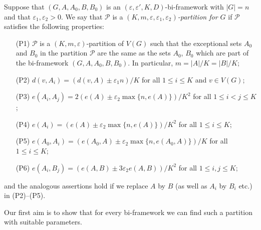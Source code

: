\documentclass{memo-l}
\def\COMMENT#1{}
\def\cP{\mathcal{P}}
\def\eps{\varepsilon}
\numberwithin{section}{chapter}
\numberwithin{equation}{section}
\numberwithin{firstthm}{section}
\numberwithin{figure}{section}
\begin{document}
{Suppose that $(G,A,A_0,B,B_0)$ is an $(\eps,\eps',K,D)$-bi-framework with $|G|=n$ and that
$\eps _1, \eps _2 >0$.
We say that $\cP$ is a \emph{$(K,m,\eps,\eps_1,\eps_2)$-partition for $G$} if 
$\cP$ satisfies the following properties:
\begin{itemize}
\item[(P1)] $\cP$ is a $(K,m,\eps)$-partition of $V(G)$
such that the exceptional sets $A_0$ and $B_0$ in the partition $\cP$ are the same as the
sets $A_0$, $B_0$ which are part of the bi-framework $(G,A,A_0,B,B_0)$. In particular, $m=|A|/K=|B|/K$;
\item[(P2)] $d(v, A_i)=(d(v, A)\pm \eps_1 n)/K$  for all $1 \le i\le K$ and $v\in V(G)$;
\item[(P3)] $e(A_i, A_j)=2(e(A) \pm  \eps_2 \max\{n, e(A)\} )/K^2$ for all $1\le i < j\le K$;
\item[(P4)] $e(A_i)=(e(A) \pm \eps_2\max\{n, e(A)\})/K^2$ for all $1 \le i\le K$;
\item[(P5)] $e(A_0, A_i)=(e(A_0, A)\pm \eps_2\max\{n, e(A_0, A)\})/K$ for all $1 \le i\le K$;
\item[(P6)] $e(A_i, B_j)=(e(A, B) \pm 3\eps_2 e(A, B))/K^2$ for all $1 \le i, j \le K$;%
   \COMMENT{Previously had $\max\{n, e(A, B)\}$ instead of just $e(A, B)$. But since we are always assuming that $D$ is
linear, we don't need the max here.}
\end{itemize}
and the analogous assertions hold if we replace $A$ by $B$ (as well as $A_i$ by $B_i$ etc.) in (P2)--(P5).\COMMENT{Check we never need e.g. a mixed condition
like $e(A_0^s, B_i)=...$ in (P5)}

Our first aim is to show that for every bi-framework we can find such a partition with suitable parameters.


}
\end{document}
